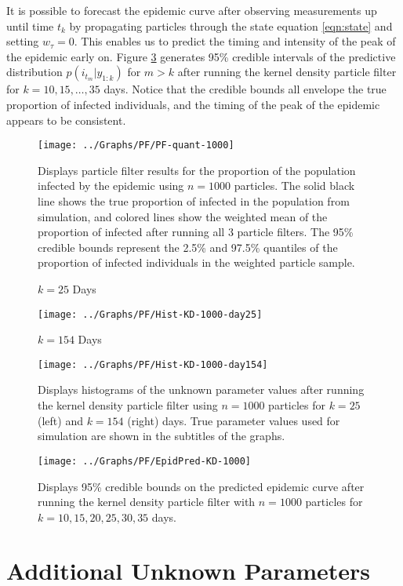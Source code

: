 \documentclass{article}
\begin{document}
It is possible to forecast the epidemic curve after observing measurements up until time $t_k$ by propagating particles through the state equation \eqref{eqn:state} and setting $w_\tau = 0$.  This enables us to predict the timing and intensity of the peak of the epidemic early on.  Figure \ref{fig:pred} generates 95\% credible intervals of the predictive distribution $p(i_{t_m}|y_{1:k})$ for $m > k$ after running the kernel density particle filter for $k = 10, 15, \ldots, 35$ days.  Notice that the credible bounds all envelope the true proportion of infected individuals, and the timing of the peak of the epidemic appears to be consistent.

\begin{figure}[ht]
\centering
\texttt{[image: ../Graphs/PF/PF-quant-1000]}
\caption{Displays particle filter results for the proportion of the population infected by the epidemic using $n = 1000$ particles.  The solid black line shows the true proportion of infected in the population from simulation, and colored lines show the weighted mean of the proportion of infected after running all 3 particle filters.  The 95\% credible bounds represent the 2.5\% and 97.5\% quantiles of the proportion of infected individuals in the weighted particle sample.} \label{fig:quant}
\end{figure}

\begin{figure}[ht]
\centering
\begin{minipage}[b]{.4\linewidth}
\caption*{$k = 25$ Days}
\texttt{[image: ../Graphs/PF/Hist-KD-1000-day25]}
\end{minipage}
\begin{minipage}[b]{.4\linewidth}
\caption*{$k = 154$ Days}
\texttt{[image: ../Graphs/PF/Hist-KD-1000-day154]}
\end{minipage}
\caption{Displays histograms of the unknown parameter values after running the kernel density particle filter using $n = 1000$ particles for $k = 25$ (left) and $k = 154$ (right) days.  True parameter values used for simulation are shown in the subtitles of the graphs.} \label{fig:hist}
\end{figure}

\begin{figure}[ht]
\centering
\texttt{[image: ../Graphs/PF/EpidPred-KD-1000]}
\caption{Displays 95\% credible bounds on the predicted epidemic curve after running the kernel density particle filter with $n = 1000$ particles for $k = 10,15,20,25,30,35$ days.} \label{fig:pred}
\end{figure}

\clearpage

\section{Additional Unknown Parameters}

\clearpage



\end{document}
